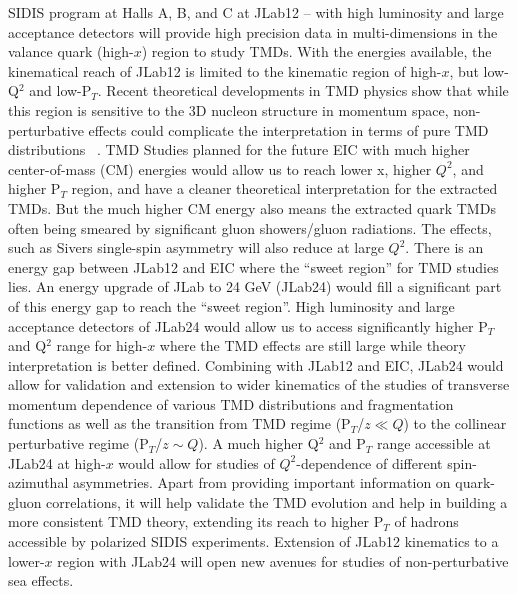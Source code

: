 SIDIS program at Halls A, B, and C at JLab12 \cite{E12-06-104}-- \cite{C12-20-002} with high luminosity and large acceptance detectors will provide high precision data in multi-dimensions in the valance quark (high-$x$) region to study TMDs. With the energies available, the kinematical reach of JLab12 is limited to the kinematic region of high-$x$, but low-Q$^2$ and low-P$_T$. Recent theoretical developments in TMD physics show that while this region is sensitive to the 3D nucleon structure in momentum space, non-perturbative effects could complicate the interpretation in terms of pure TMD distributions ~\cite{Scimemi:2019cmh}. TMD Studies planned for the future EIC with much higher center-of-mass (CM) energies would allow us to reach lower x, higher $Q^2$, and higher P$_T$ region, and have a cleaner theoretical interpretation for the extracted TMDs. But the much higher CM energy also means the extracted quark TMDs often being smeared by significant gluon showers/gluon radiations. The effects, such as Sivers single-spin asymmetry will also reduce at large $Q^2$. There is an energy gap between JLab12 and EIC where the “sweet region” for TMD studies lies. An energy upgrade of JLab to 24 GeV (JLab24) would fill a significant part of this energy gap to reach the “sweet region”. High luminosity and large acceptance detectors of JLab24 would allow us to access significantly higher P$_T$ and Q$^2$ range for high-$x$ where the TMD effects are still large while theory interpretation is better defined. Combining with JLab12 and EIC, JLab24 would allow for validation and extension to wider kinematics of the studies of transverse momentum dependence of various TMD distributions and fragmentation functions as well as the transition from TMD regime (P$_T$/$z\ll Q$) to the collinear perturbative regime (P$_T$/$z\sim Q$). A much higher Q$^2$ and P$_T$ range accessible at JLab24 at high-$x$ would allow for studies of $Q^2$-dependence of different spin-azimuthal asymmetries. Apart from providing important information on quark-gluon correlations, it will help validate the TMD evolution and help in building a more consistent TMD theory, extending its reach to higher P$_T$ of hadrons accessible by polarized SIDIS experiments. Extension of JLab12 kinematics to a lower-$x$ region with JLab24 will open new avenues for studies of non-perturbative sea effects.


